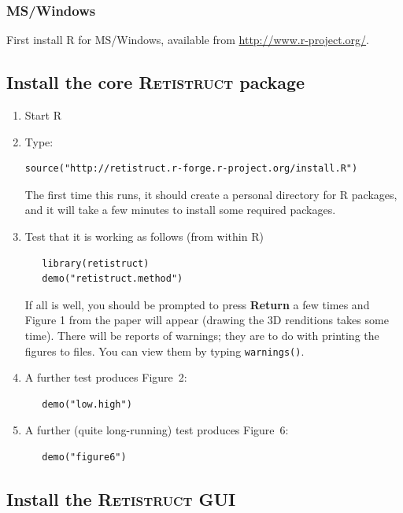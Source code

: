 \documentclass{article}
\begin{document}
\subsubsection{MS/Windows}

First install R for MS/Windows, available from \url{http://www.r-project.org/}.

\subsection{Install the core \textsc{Retistruct} package}

\begin{enumerate}
\item Start \textsc{R}
 \item  Type:
\begin{verbatim}
source("http://retistruct.r-forge.r-project.org/install.R")
\end{verbatim}
   The first time this runs, it should create a personal directory for
   R packages, and it will take a few minutes to install some required
   packages.
 \item Test that it is working as follows (from within R)
\begin{verbatim}
   library(retistruct)
   demo("retistruct.method")
\end{verbatim}
   If all is well, you should be prompted to press \textbf{Return} a
   few times and Figure 1 from the paper \cite{SterrattEtal2012} will
   appear (drawing the 3D renditions takes some time). There will be
   reports of warnings; they are to do with printing the figures to
   files. You can view them by typing \texttt{warnings()}.
 \item A further test produces Figure~2:
\begin{verbatim}
   demo("low.high")
\end{verbatim}
 \item A further (quite long-running) test produces Figure~6:
\begin{verbatim}
   demo("figure6")
\end{verbatim}
\end{enumerate}

\subsection{Install the \textsc{Retistruct} GUI}
\label{retistruct-manual:sec:inst-retistr-gui}
\end{document}
